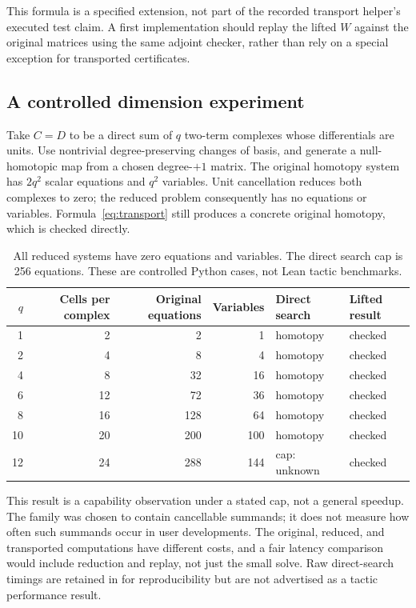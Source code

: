 \documentclass[11pt,letterpaper]{article}
\theoremstyle{definition}\newtheorem{definition}[theorem]{Definition}
\theoremstyle{remark}\newtheorem{remark}[theorem]{Remark}
\newcommand{\code}[1]{\texttt{\detokenize{#1}}}
\begin{document}
This formula is a specified extension, not part of the recorded transport
helper's executed test claim. A first implementation should replay the lifted
$W$ against the original matrices using the same adjoint checker, rather than
rely on a special exception for transported certificates.

\subsection{A controlled dimension experiment}
Take $C=D$ to be a direct sum of $q$ two-term complexes whose differentials are
units. Use nontrivial degree-preserving changes of basis, and generate a
null-homotopic map from a chosen degree-$+1$ matrix. The original homotopy system
has $2q^2$ scalar equations and $q^2$ variables. Unit cancellation reduces both
complexes to zero; the reduced problem consequently has no equations or
variables. Formula~\eqref{eq:transport} still produces a concrete original
homotopy, which is checked directly.

\begin{table}[ht]
\centering\small
\begin{tabular}{@{}rrrrll@{}}
\toprule
$q$ & Cells per complex & Original equations & Variables & Direct search & Lifted result\\
\midrule
1 & 2 & 2 & 1 & homotopy & checked\\
2 & 4 & 8 & 4 & homotopy & checked\\
4 & 8 & 32 & 16 & homotopy & checked\\
6 & 12 & 72 & 36 & homotopy & checked\\
8 & 16 & 128 & 64 & homotopy & checked\\
10 & 20 & 200 & 100 & homotopy & checked\\
12 & 24 & 288 & 144 & cap: unknown & checked\\
\bottomrule
\end{tabular}
\caption{All reduced systems have zero equations and variables. The direct
search cap is 256 equations. These are controlled Python cases, not Lean tactic
benchmarks.}
\end{table}

This result is a capability observation under a stated cap, not a general
speedup. The family was chosen to contain cancellable summands; it does not
measure how often such summands occur in user developments. The original,
reduced, and transported computations have different costs, and a fair latency
comparison would include reduction and replay, not just the small solve.
Raw direct-search timings are retained in \code{ablations.json} for
reproducibility but are not advertised as a tactic performance result.
\end{document}
